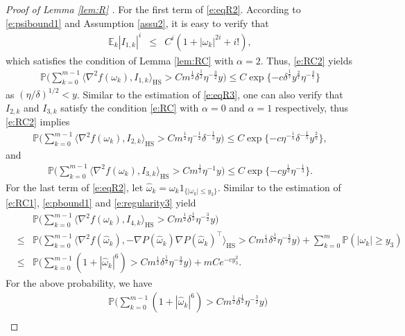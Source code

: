 \documentclass[12pt]{amsart}
\theoremstyle{definition}
\theoremstyle{remark}
\numberwithin{equation}{section}
\newcommand{\E}{\mathbb{E}}            %
\newcommand{\Ll}{\langle}
\newcommand{\Rr}{\rangle}
\newcommand{\PP}{\mathbb{P}}
\begin{document}
\begin{proof}[Proof of Lemma \ref{lem:R} ]
	For the first term of \eqref{e:eqR2}.
	According to \eqref{e:psibound1} and Assumption \ref{assu2},	
	it is easy to verify that
	\begin{eqnarray*}
		\E_{k}|I_{1,k}|^i
		&\le& C^i(1+|\omega_k|^{2i}+i!),
	\end{eqnarray*}
	which satisfies the condition of Lemma \ref{lem:RC} with $\alpha=2$. Thus, \eqref{e:RC2} yields
	\begin{eqnarray}\label{e:eqR3}
		\PP\big(\sum_{k=0}^{m-1}\Ll \nabla^2f(\omega_k ), 
		I_{1,k}\Rr_\mathrm{HS}>C m^{\frac12}\delta^{\frac12}\eta^{-\frac32} y
		\big)	\le C\exp\{-c\delta^\frac17 y^\frac27\eta^{-\frac37}\}
	\end{eqnarray}
as $(\eta/\delta)^{1/2}<y$. Similar to the estimation of \eqref{e:eqR3}, one can also verify that $I_{2,k}$ and $I_{3,k}$ satisfy the condition \eqref{e:RC} with $\alpha=0$ and $\alpha=1$ respectively, thus \eqref{e:RC2} implies
	\begin{eqnarray}\label{e:eqR4}
		\PP\big(\sum_{k=0}^{m-1}\Ll \nabla^2f(\omega_k ), I_{2,k}\Rr_\mathrm{HS}>C m^{\frac12}\eta^{-\frac12}\delta^{-\frac12} y
		\big)\le C\exp\{-c\eta^{-\frac15}\delta^{-\frac15}y^{\frac25}\},
	\end{eqnarray}
	and
	\begin{eqnarray}\label{e:eqR5}
		\PP\big(\sum_{k=0}^{m-1}\Ll \nabla^2f(\omega_k ), I_{3,k}\Rr_\mathrm{HS}>C m^{\frac12}\eta^{-1} y\big)\le C\exp\{-cy^{\frac13}\eta^{-\frac13}\}.
	\end{eqnarray}
	For the last term of \eqref{e:eqR2}, let $\hat\omega_k=\omega_k1_{\{|\omega_k|\le y_3\}}$. Similar to the estimation of \eqref{e:RC1}, \eqref{e:pbound1} and \eqref{e:regularity3} yield
	\begin{eqnarray*}
		&&\PP\big(\sum_{k=0}^{m-1}\Ll \nabla^2f(\omega_k ), 
		I_{4,k}\Rr_\mathrm{HS}>C m^{\frac12}\delta^{\frac12}\eta^{-\frac32} y
		\big)\\
		&\le&  \PP\big(\sum_{k=0}^{m-1}\Ll \nabla^2f(\hat\omega_k ), 
		-\nabla P(\hat\omega_k)\nabla P(\hat\omega_k)^\top\Rr_\mathrm{HS}>C m^{\frac12}\delta^{\frac12}\eta^{-\frac32} y\big)+\sum_{k=0}^{m}\PP(|\omega_k|\ge y_3)\\
		&\le&  \PP\big(\sum_{k=0}^{m-1}
		(1+|\hat\omega_k|^6)>C m^{\frac12}\delta^{\frac12}\eta^{-\frac32} y\big)+mCe^{-cy_3^2}.
	\end{eqnarray*}
	For the above probability, we have
	\begin{eqnarray*}
		&&  \PP\big(\sum_{k=0}^{m-1}
		(1+|\hat\omega_k|^6)>C m^{\frac12}\delta^{\frac12}\eta^{-\frac32} y\big)\\

\end{eqnarray*}
\end{proof}
\end{document}
